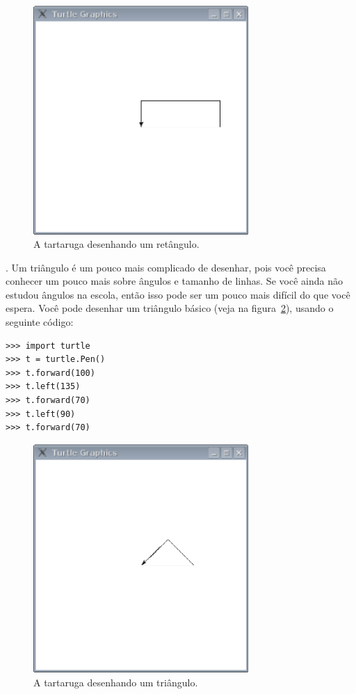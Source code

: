 \begin{figure}
\begin{center}
\includegraphics[width=82mm]{eps/figure46.eps}
\end{center}
\caption{A tartaruga desenhando um retângulo.}\label{fig46}
\end{figure}

. Um triângulo é um pouco mais complicado de desenhar, pois você precisa conhecer um pouco mais sobre ângulos e tamanho de linhas. Se você ainda não estudou ângulos na escola, então isso pode ser um pouco mais difícil do que você espera. Você pode desenhar um triângulo básico (veja na figura~\ref{fig47}), usando o seguinte código:

\begin{listing}
\begin{verbatim}
>>> import turtle
>>> t = turtle.Pen()
>>> t.forward(100)
>>> t.left(135)
>>> t.forward(70)
>>> t.left(90)
>>> t.forward(70)
\end{verbatim}
\end{listing}

\begin{figure}
\begin{center}
\includegraphics[width=82mm]{eps/figure47.eps}
\end{center}
\caption{A tartaruga desenhando um triângulo.}\label{fig47}
\end{figure}


